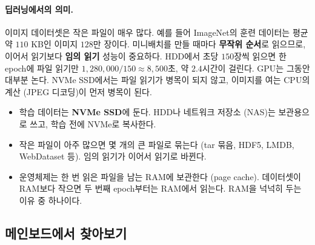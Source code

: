 \documentclass[11pt,a4paper]{article}
\begin{document}
\paragraph{딥러닝에서의 의미.}
이미지 데이터셋은 작은 파일이 매우 많다. 예를 들어 ImageNet의 훈련 데이터는 평균 약 $110$ KB인 이미지 $128$만 장이다.
미니배치를 만들 때마다 \textbf{무작위 순서}로 읽으므로, 이어서 읽기보다 \textbf{임의 읽기} 성능이 중요하다.
HDD에서 초당 $150$장씩 읽으면 한 epoch에 파일 읽기만 $1{,}280{,}000/150\approx8{,}500$초, 약 $2.4$시간이 걸린다. GPU는 그동안 대부분 논다.
NVMe SSD에서는 파일 읽기가 병목이 되지 않고, 이미지를 여는 CPU의 계산 (JPEG 디코딩)이 먼저 병목이 된다.

\begin{itemize}[leftmargin=1.5em]
\item 학습 데이터는 \textbf{NVMe SSD}에 둔다. HDD나 네트워크 저장소 (NAS)는 보관용으로 쓰고, 학습 전에 NVMe로 복사한다.
\item 작은 파일이 아주 많으면 몇 개의 큰 파일로 묶는다 (tar 묶음, HDF5, LMDB, WebDataset 등). 임의 읽기가 이어서 읽기로 바뀐다.
\item 운영체제는 한 번 읽은 파일을 남는 RAM에 보관한다 (page cache). 데이터셋이 RAM보다 작으면 두 번째 epoch부터는 RAM에서 읽는다. RAM을 넉넉히 두는 이유 중 하나이다.
\end{itemize}

\subsection{메인보드에서 찾아보기}\label{sec:board_photo}
\end{document}
